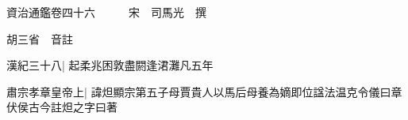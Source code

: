 






























































資治通鑑卷四十六　　　宋　司馬光　撰

胡三省　音註

漢紀三十八|{
	起柔兆困敦盡閼逢涒灘凡五年}


肅宗孝章皇帝上|{
	諱炟顯宗第五子母賈貴人以馬后母養為嫡即位諡法温克令儀曰章伏侯古今註炟之字曰著}


